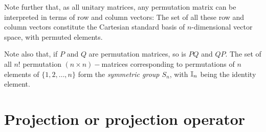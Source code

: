 Note further that, as all unitary matrices, any permutation matrix can be interpreted in terms of row and column vectors:
The set of all these row and column vectors constitute the Cartesian standard basis of $n$-dimensional vector space,
with permuted elements.

Note also that, if $P$ and $Q$ are permutation matrices, so is $PQ$ and $QP$.
The set of all $n!$
permutation $(n\times n)-$matrices corresponding to permutations of $n$ elements of $\{ 1,2,\ldots ,n\}$ form the
{\em symmetric group $S_n$}, with ${\Bbb I}_n$ being the identity element.



\section{Projection or projection operator}
\label{2011-m-projec}


